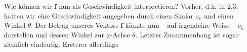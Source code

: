 \documentclass[a4paper,12pt,ngerman]{scrartcl}
\theoremstyle{plain}
\theoremstyle{plain}
\theoremstyle{plain}
\theoremstyle{plain}
\begin{document}
Wie können wir $\pmb{f}$ nun als Geschwindigkeit interpretieren? Vorher, d.h. in 2.3, hatten wir eine Geschwindigkeit angegeben durch einen Skalar $v_e$ und einen Winkel $\theta$. Der Betrag unseres Vektors $\pmb{f}$ könnte nun -- auf irgendeine Weise -- $v_e$ darstellen und dessen Winkel zur x-Achse $\theta$. Letzter Zusammenhang ist sogar ziemlich eindeutig. Ersterer allerdings

%
%
%
\end{document}
